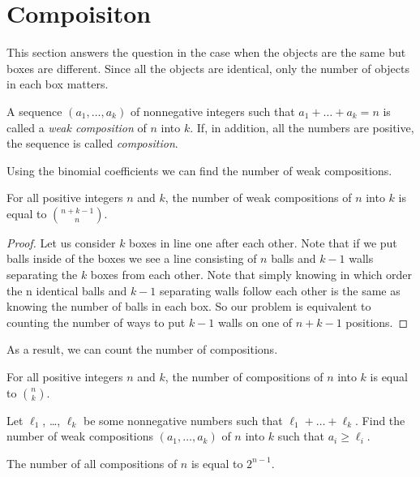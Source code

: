 \section{Compoisiton}
This section answers the question in the case when the objects
are the same but boxes are different. Since all the objects
are identical, only the number of objects in each box matters.

\begin{definition}
  A sequence $(a_1, \dots, a_k)$ of nonnegative integers such
  that $a_1 + \dots + a_k = n$ is called a \emph{weak composition}
  of $n$ into $k$. If, in addition, all the numbers are positive,
  the sequence is called \emph{composition}.
\end{definition}

Using the binomial coefficients we can find the number of weak
compositions.
\begin{theorem}
  For all positive integers $n$ and $k$,
  the number of weak compositions of $n$ into $k$ is equal to
  $\binom{n + k - 1}{n}$.
\end{theorem}
\begin{proof}
  Let us consider $k$ boxes in line one after each other. Note that if we
  put balls inside of the boxes we see a line consisting of $n$ balls and
  $k - 1$ walls separating the $k$ boxes from each other. Note that simply
  knowing in which order the n identical balls and $k - 1$ separating walls
  follow each other is the same as knowing the number of balls in each box.
  So our problem is equivalent to counting the number of ways to put $k - 1$
  walls on one of $n + k - 1$ positions.
\end{proof}

As a result, we can count the number of compositions.
\begin{corollary}
  For all positive integers $n$ and $k$,
  the number of compositions of $n$ into $k$ is equal to
  $\binom{n}{k}$.
\end{corollary}

\begin{exercise}
  Let $\ell_1$, \dots, $\ell_k$ be some nonnegative numbers
  such that $\ell_1 + \dots + \ell_k$.
  Find the number of weak compositions $(a_1, \dots, a_k)$
  of $n$ into $k$ such that $a_i \ge \ell_i$.
\end{exercise}

\begin{corollary}
  The number of all compositions of $n$ is equal to $2^{n - 1}$.
\end{corollary}

